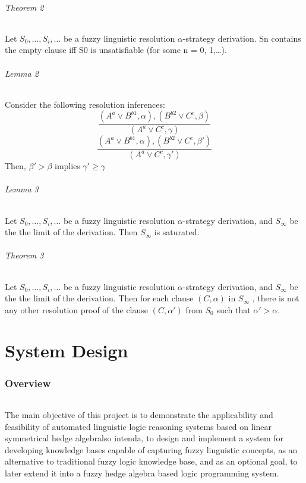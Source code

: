 \documentclass[26pt,fleqn,]{article}
\begin{document}
\paragraph{Theorem 2}
Let $S_{0},\ldots,S_{i},\ldots$ be a fuzzy linguistic resolution $\alpha$-strategy derivation.
Sn contains the empty clause iff S0 is unsatisfiable (for some n = 0, 1,\ldots).
\paragraph{Lemma 2} 
Consider the following resolution inferences:
\[ \frac{(A^{a} \vee B^{b1}, \alpha), (B^{b2} \vee C^{c}, \beta)} {(A^{a} \vee C^{c}, \gamma)}\]
\[\frac{(A^{a} \vee B^{b1}, \alpha), (B^{b2} \vee C^{c}, \beta')} {(A^{a} \vee C^{c}, \gamma')}\]
Then, $\beta' > \beta$ implies $\gamma' \ge \gamma$

\paragraph{Lemma 3} Let $S_{0},\ldots,S_{i},\ldots$ be a fuzzy linguistic 
resolution $\alpha$-strategy derivation, and $S_{\infty}$ be the the limit of the derivation.
Then $S_{\infty}$ is saturated.

\paragraph{Theorem 3} Let $S_{0},\ldots,S_{i},\ldots$ be a fuzzy linguistic 
resolution $\alpha$-strategy derivation, and $S_{\infty}$ be the the limit of the derivation. 
Then for each clause $(C, \alpha)$ in $S_{\infty}$ , there is not any other resolution proof 
of the clause $(C, \alpha')$ from $S_{0}$ such that $\alpha' > \alpha$.


\part{System Design}

\section{Overview}
	
\paragraph{} The main objective of this project is to demonstrate the applicability and feasibility of automated linguistic logic reasoning systems based on linear symmetrical hedge algebralso intenda, to design and implement a system for developing knowledge bases capable of capturing fuzzy linguistic 
concepts, as an alternative to traditional fuzzy logic knowledge base, and as an optional goal, to later extend it into a fuzzy hedge algebra based logic programming system.\\
\end{document}
